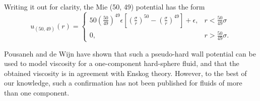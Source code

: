 Writing it out for clarity, the Mie (50, 49) potential has the form
\begin{equation}
    u_{(50, 49)}(r) = 
    \begin{cases}
        50
        \left(\frac{50}{49}\right)
        ^{49}
        \epsilon \left[
            \left(\frac{\sigma}{r}\right)^{50} -
            \left(\frac{\sigma}{r}\right)^{49}
        \right]
        + \epsilon,
            & r < \frac{50}{49} \sigma\\
        0,  & r > \frac{50}{49} \sigma.
    \end{cases}
\end{equation}

Pousaneh and de Wijn \cite{ref:pousaneh:shear_viscosity} 
have shown that such a pseudo-hard wall potential 
can be used to model viscosity for a one-component hard-sphere fluid, 
and that the obtained viscosity is in agreement with Enskog theory.
However, to the best of our knowledge, such a confirmation has not 
been published for fluids of more than one component. 
